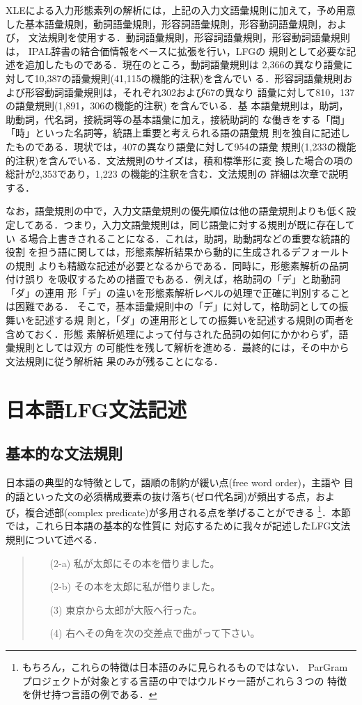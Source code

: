 XLEによる入力形態素列の解析には，上記の入力文語彙規則に加えて，予め用意
した基本語彙規則，動詞語彙規則，形容詞語彙規則，形容動詞語彙規則，および，
文法規則を使用する．動詞語彙規則，形容詞語彙規則，形容動詞語彙規則は，
IPAL辞書\cite{IPALa,IPALb}の結合価情報をベースに拡張を行い，LFGの
規則として必要な記述を追加したものである．現在のところ，動詞語彙規則は
2,366の異なり語彙に対して10,387の語彙規則(41,115の機能的注釈)を含んでい
る．形容詞語彙規則および形容動詞語彙規則は，それぞれ302および67の異なり
語彙に対して810，137の語彙規則(1,891，306の機能的注釈) を含んでいる．基
本語彙規則は，助詞，助動詞，代名詞，接続詞等の基本語彙に加え，接続助詞的
な働きをする「間」「時」といった名詞等，統語上重要と考えられる語の語彙規
則を独自に記述したものである．現状では，407の異なり語彙に対して954の語彙
規則(1,233の機能的注釈)を含んでいる．文法規則のサイズは，積和標準形に変
換した場合の項の総計が2,353であり，1,223 の機能的注釈を含む．文法規則の
詳細は次章で説明する．

なお，語彙規則の中で，入力文語彙規則の優先順位は他の語彙規則よりも低く設
定してある．つまり，入力文語彙規則は，同じ語彙に対する規則が既に存在してい
る場合上書きされることになる．これは，助詞，助動詞などの重要な統語的役割
を担う語に関しては，形態素解析結果から動的に生成されるデフォールトの規則
よりも精緻な記述が必要となるからである．同時に，形態素解析の品詞付け誤り
を吸収するための措置でもある．例えば，格助詞の「デ」と助動詞「ダ」の連用
形「デ」の違いを形態素解析レベルの処理で正確に判別することは困難である．
そこで，基本語彙規則中の「デ」に対して，格助詞としての振舞いを記述する規
則と，「ダ」の連用形としての振舞いを記述する規則の両者を含めておく．形態
素解析処理によって付与された品詞の如何にかかわらず，語彙規則としては双方
の可能性を残して解析を進める．最終的には，その中から文法規則に従う解析結
果のみが残ることになる．


\section{日本語LFG文法記述}
\subsection{基本的な文法規則}
日本語の典型的な特徴として，語順の制約が緩い点(free word order)，主語や
目的語といった文の必須構成要素の抜け落ち(ゼロ代名詞)が頻出する点，およ
び，複合述部(complex predicate)が多用される点を挙げることができる
\footnote{もちろん，これらの特徴は日本語のみに見られるものではない．
ParGramプロジェクトが対象とする言語の中ではウルドゥー語がこれら３つの
特徴を併せ持つ言語の例である．}．本節では，これら日本語の基本的な性質に
対応するために我々が記述したLFG文法規則について述べる．
\begin{quote}
\begin{itemize}
\item[(2-a)] 私が太郎にその本を借りました。
\item[(2-b)] その本を太郎に私が借りました。
\item[(3)] 東京から太郎が大阪へ行った。
\item[(4)] 右へその角を次の交差点で曲がって下さい。
\end{itemize}
\end{quote}

